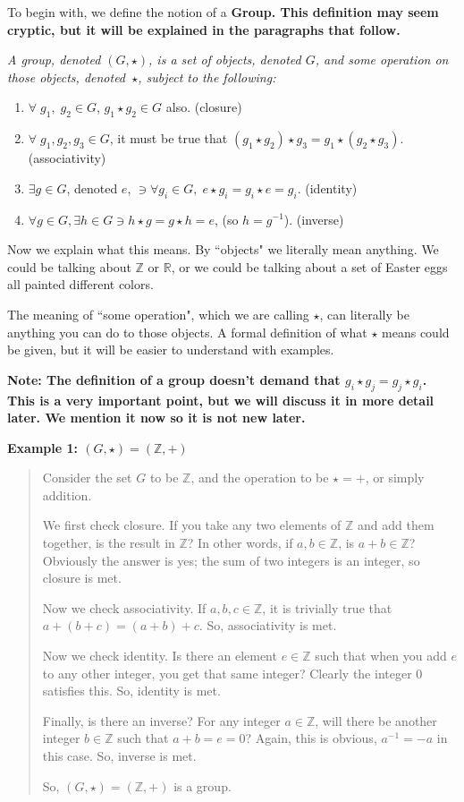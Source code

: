 \documentclass[12pt,epsf]{article}
\begin{document}
To begin with, we define the notion of a \bf Group\rm.	This definition
may seem cryptic, but it will be explained in the paragraphs that
follow.  

\it A group, denoted $(G,\star)$, is a set of objects, denoted $G$, and
some operation on those objects, denoted~$\star$, subject to the
following:
\begin{enumerate}
\parskip -4pt
\item $\forall \; g_1,\; g_2 \in G$, $g_1\star g_2 \in G$ also.
(closure)
\item $\forall \; g_1,g_2,g_3\in G$, it must be true that
$(g_1\star g_2)\star g_3 = g_1 \star (g_2 \star g_3)$. (associativity)
\item $\exists g \in G$, denoted $e$, $\ni \forall g_i\in G,\;
e\star g_i = g_i \star e = g_i$. (identity)
\item $\forall g\in G, \exists h \in G \ni h \star g = g \star h =
e$, (so $h = g^{-1}$). (inverse)
\end{enumerate}

\rm Now we explain what this means.  By ``objects" we literally mean
anything.  We could be talking about $\mathbb{Z}$ or $\mathbb{R}$, or
we could be talking about a set of Easter eggs all painted different
colors.  

The meaning of ``some operation", which we are calling $\star$, can
literally be anything you can do to those objects.  A formal definition
of what $\star$ means could be given, but it will be easier to
understand with examples.  

\bf Note: \rm The definition of a group doesn't demand that
$g_i \star g_j = g_j \star g_i$.  This is a very important point, but
we will discuss it in more detail later.  We mention it now so it is
not new later.	

\bf Example 1: \rm \quad $(G,\star) = (\mathbb{Z},+)$
\vspace*{-2ex}
\begin{quote}
Consider the set $G$ to be $\mathbb{Z}$, and the
operation to be $\star = +$, or simply addition.  

We first check closure.  If you take any two elements of $\mathbb{Z}$
and add them together, is the result in $\mathbb{Z}$?  In other words,
if $a,b \in \mathbb{Z}$, is $a+b\in \mathbb{Z}$?  Obviously the answer
is yes; the sum of two integers is an integer, so closure is met.  

Now we check associativity.  If $a,b,c \in \mathbb{Z}$, it is trivially
true that $a+(b+c) = (a+b)+c$.	So, associativity is met.  

Now we check identity.	Is there an element $e\in \mathbb{Z}$ such that
when you add $e$ to any other integer, you get that same integer? 
Clearly the integer 0 satisfies this.  So, identity is met.  

Finally, is there an inverse?  For any integer $a\in \mathbb{Z}$, will
there be another integer $b\in \mathbb{Z}$ such that $a+b = e = 0$? 
Again, this is obvious, $a^{-1} = -a$ in this case.  So, inverse is
met.  

So, $(G,\star) = (\mathbb{Z},+)$ is a group.  
\end{quote}
\end{document}
